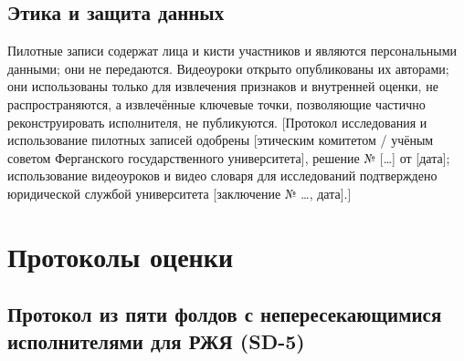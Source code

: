 \documentclass[a4paper,fleqn]{cas-dc}
\begin{document}
\hypertarget{ux44dux442ux438ux43aux430-ux438-ux437ux430ux449ux438ux442ux430-ux434ux430ux43dux43dux44bux445}{%
\subsection{Этика и защита данных}\label{ux44dux442ux438ux43aux430-ux438-ux437ux430ux449ux438ux442ux430-ux434ux430ux43dux43dux44bux445}}

Пилотные записи содержат лица и кисти участников и являются персональными данными; они не передаются. Видеоуроки открыто опубликованы их авторами; они использованы только для извлечения признаков и внутренней оценки, не распространяются, а извлечённые ключевые точки, позволяющие частично реконструировать исполнителя, не публикуются. {\color{red}[Протокол исследования и использование пилотных записей одобрены {\color{red}[этическим комитетом / учёным советом Ферганского государственного университета]}, решение № {\color{red}[\ldots]} от {\color{red}[дата]}; использование видеоуроков и видео словаря для исследований подтверждено юридической службой университета {\color{red}[заключение № \ldots, дата]}.]}

\hypertarget{ux43fux440ux43eux442ux43eux43aux43eux43bux44b-ux43eux446ux435ux43dux43aux438}{%
\section{Протоколы оценки}\label{ux43fux440ux43eux442ux43eux43aux43eux43bux44b-ux43eux446ux435ux43dux43aux438}}

\hypertarget{ux43fux440ux43eux442ux43eux43aux43eux43b-ux438ux437-ux43fux44fux442ux438-ux444ux43eux43bux434ux43eux432-ux441-ux43dux435ux43fux435ux440ux435ux441ux435ux43aux430ux44eux449ux438ux43cux438ux441ux44f-ux438ux441ux43fux43eux43bux43dux438ux442ux435ux43bux44fux43cux438-ux434ux43bux44f-ux440ux436ux44f-sd-5}{%
\subsection{Протокол из пяти фолдов с непересекающимися исполнителями для РЖЯ (SD-5)}\label{ux43fux440ux43eux442ux43eux43aux43eux43b-ux438ux437-ux43fux44fux442ux438-ux444ux43eux43bux434ux43eux432-ux441-ux43dux435ux43fux435ux440ux435ux441ux435ux43aux430ux44eux449ux438ux43cux438ux441ux44f-ux438ux441ux43fux43eux43bux43dux438ux442ux435ux43bux44fux43cux438-ux434ux43bux44f-ux440ux436ux44f-sd-5}}
\end{document}
